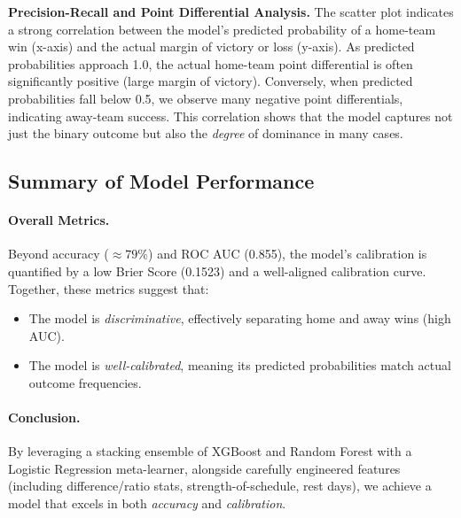 \documentclass[12pt]{article}
\begin{document}
\noindent
\textbf{Precision-Recall and Point Differential Analysis.}
The scatter plot indicates a strong correlation between the model’s predicted probability of a home-team win (x-axis) and the actual margin of victory or loss (y-axis). As predicted probabilities approach 1.0, the actual home-team point differential is often significantly positive (large margin of victory). Conversely, when predicted probabilities fall below 0.5, we observe many negative point differentials, indicating away-team success. This correlation shows that the model captures not just the binary outcome but also the \emph{degree} of dominance in many cases.

\subsection{Summary of Model Performance}

\paragraph{Overall Metrics.}
Beyond accuracy (\(\approx 79\%\)) and ROC AUC (0.855), the model’s calibration is quantified by a low Brier Score (0.1523) and a well-aligned calibration curve. Together, these metrics suggest that:
\begin{itemize}
    \item The model is \emph{discriminative}, effectively separating home and away wins (high AUC).
    \item The model is \emph{well-calibrated}, meaning its predicted probabilities match actual outcome frequencies.
\end{itemize}

\paragraph{Conclusion.}
By leveraging a stacking ensemble of XGBoost and Random Forest with a Logistic Regression meta-learner, alongside carefully engineered features (including difference/ratio stats, strength-of-schedule, rest days), we achieve a model that excels in both \emph{accuracy} and \emph{calibration}.
\end{document}
